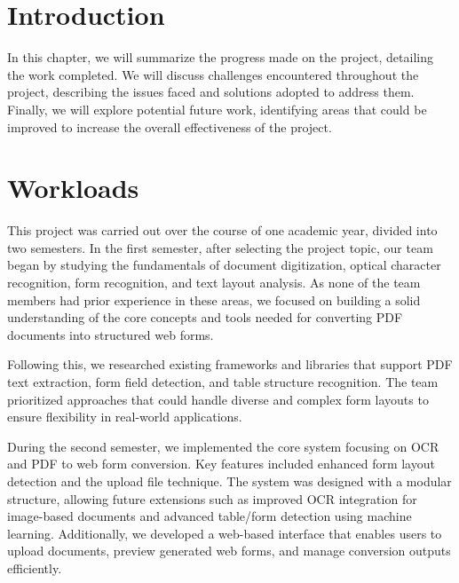 \documentclass[12pt,oneside,openright,a4paper]{cpe-english-project}
\begin{document}
\section {Introduction}

In this chapter, we will summarize the progress made on the project, detailing the work completed. We will
discuss challenges encountered throughout the project, describing the issues faced and solutions adopted to
address them. Finally, we will explore potential future work, identifying areas that could be improved to
increase the overall effectiveness of the project.

\section {Workloads}
This project was carried out over the course of one academic year, divided into two semesters. In the first semester, after selecting the project topic, our team began by studying the fundamentals of document digitization, optical character recognition, form recognition, and text layout analysis. As none of the team members had prior experience in these areas, we focused on building a solid understanding of the core concepts and tools needed for converting PDF documents into structured web forms. 

Following this, we researched existing frameworks and libraries that support PDF text extraction, form field detection, and table structure recognition. The team prioritized approaches that could handle diverse and complex form layouts to ensure flexibility in real-world applications.

During the second semester, we implemented the core system focusing on OCR and PDF to web form conversion. Key features included enhanced form layout detection and the upload file technique. The system was designed with a modular structure, allowing future extensions such as improved OCR integration for image-based documents and advanced table/form detection using machine learning. Additionally, we developed a web-based interface that enables users to upload documents, preview generated web forms, and manage conversion outputs efficiently.
\end{document}

